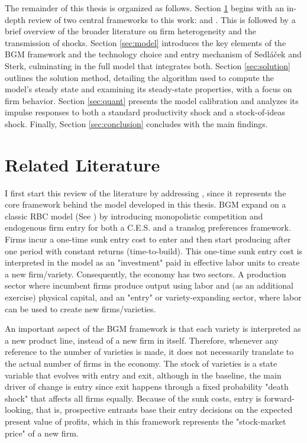 \documentclass[a4paper,12pt]{article} %
\numberwithin{equation}{section} %
\numberwithin{figure}{section}
\numberwithin{table}{section}
\begin{document}
The remainder of this thesis is organized as follows. Section \ref{sec:literature} begins with an in-depth review of two central frameworks 
to this work: \textcite{bilbiie2012endogenous} and \textcite{sedlavcek2017growth}. This is followed by a brief overview of the broader literature 
on firm heterogeneity and the transmission of shocks. Section \ref{sec:model} introduces the key elements of the BGM framework and the technology 
choice and entry mechanism of Sedláček and Sterk, culminating in the full model that integrates both. Section \ref{sec:solution} outlines the 
solution method, detailing the algorithm used to compute the model’s steady state and examining its steady-state properties, with a focus on firm 
behavior. Section \ref{sec:quant} presents the model calibration and analyzes its impulse responses to both a standard productivity shock and a 
stock-of-ideas shock. Finally, Section \ref{sec:conclusion} concludes with the main findings.


\section{Related Literature}
\label{sec:literature}



I first start this review of the literature by addressing \textcite{bilbiie2012endogenous}, since it represents the core framework behind the model developed in this thesis. 
BGM expand on a classic RBC model (See \cite{campbell1994inspecting}) by introducing monopolistic competition and endogenous firm entry for both a C.E.S. and a translog preferences framework. 
Firms incur a one-time sunk entry cost to enter and then start producing after one period with constant returns (time-to-build). 
This one-time sunk entry cost is interpreted in the model as an "investment" paid in effective labor units to create a new firm/variety. Consequently, the economy has two sectors. 
A production sector where incumbent firms produce output using labor and (as an additional exercise) physical capital, and an "entry" or variety-expanding sector, where labor can be used to create new firms/varieties. 

An important aspect of the BGM framework is that each variety is interpreted as a new product line, instead of a new firm in itself. 
Therefore, whenever any reference to the number of varieties is made, it does not necessarily translate to the actual number of firms in the economy. 
The stock of varieties is a state variable that evolves with entry and exit, although in the baseline, the main driver of change is entry 
since exit happens through a fixed probability "death shock" that affects all firms equally. Because of the sunk costs, entry is forward-looking,
that is, prospective entrants base their entry decisions on the expected present value of profits, which in this framework represents the "stock-market price" of a new firm. 
\end{document}
